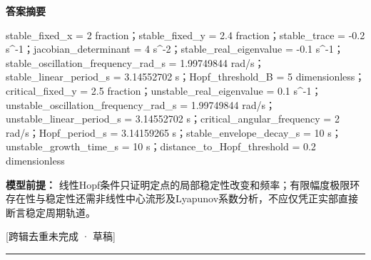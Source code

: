 \documentclass[UTF8,11pt,a4paper]{ctexart}
\begin{document}
\noindent\textbf{答案摘要}\par
stable\_fixed\_x = 2 fraction；stable\_fixed\_y = 2.4 fraction；stable\_trace = -0.2 s\textasciicircum{}-1；jacobian\_determinant = 4 s\textasciicircum{}-2；stable\_real\_eigenvalue = -0.1 s\textasciicircum{}-1；stable\_oscillation\_frequency\_rad\_s = 1.99749844 rad/s；stable\_linear\_period\_s = 3.14552702 s；Hopf\_threshold\_B = 5 dimensionless；critical\_fixed\_y = 2.5 fraction；unstable\_real\_eigenvalue = 0.1 s\textasciicircum{}-1；unstable\_oscillation\_frequency\_rad\_s = 1.99749844 rad/s；unstable\_linear\_period\_s = 3.14552702 s；critical\_angular\_frequency = 2 rad/s；Hopf\_period\_s = 3.14159265 s；stable\_envelope\_decay\_s = 10 s；unstable\_growth\_time\_s = 10 s；distance\_to\_Hopf\_threshold = 0.2 dimensionless\par
\noindent\textbf{模型前提：}
线性Hopf条件只证明定点的局部稳定性改变和频率；有限幅度极限环存在性与稳定性还需非线性中心流形及Lyapunov系数分析，不应仅凭正实部直接断言稳定周期轨道。\par
\noindent\textcolor{red!65!black}{[跨辑去重未完成 · 草稿]} \par
\medskip\hrule\medskip
{}
\end{document}
